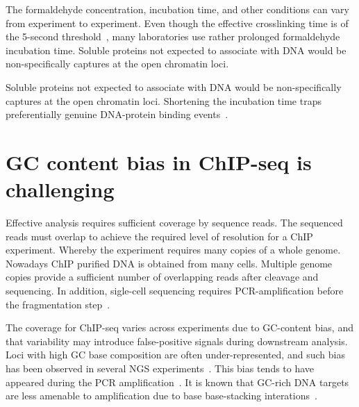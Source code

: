 The formaldehyde concentration, incubation time, and other conditions can vary from experiment to experiment. 
Even though the effective crosslinking time is of the 5-second threshold~\cite{schmiedeberg2009temporal}, many laboratories use rather prolonged formaldehyde incubation time.
Soluble proteins not expected to associate with DNA would be non-specifically captures at the open chromatin loci.

Soluble proteins not expected to associate with DNA would be non-specifically captures at the open chromatin loci. Shortening the incubation time traps preferentially genuine DNA-protein binding events~\cite{baranello2016chip}.



\section{GC content bias in ChIP-seq is challenging}
Effective analysis requires sufficient coverage by sequence reads. 
The sequenced reads must overlap to achieve the required level of resolution for a ChIP experiment.
Whereby the experiment requires many copies of a whole genome.
Nowadays ChIP purified DNA is obtained from many cells.
Multiple genome copies provide a sufficient number of overlapping reads after cleavage and sequencing.
In addition, sigle-cell sequencing requires PCR-amplification before the fragmentation step~\cite{clark2016single}.


The coverage for ChIP-seq varies across experiments due to GC-content bias, and that variability may introduce false-positive signals during downstream analysis.
Loci with high GC base composition are often under-represented, and such bias has been observed in several NGS experiments~\cite{benjamini2012summarizing,dohm2008substantial,teng2017accounting}.
This bias tends to have appeared during the PCR amplification~\cite{ross2013characterizing}.
It is known that GC-rich DNA targets are less amenable to amplification due to base base-stacking interations~\cite{yakovchuk2006base}.

